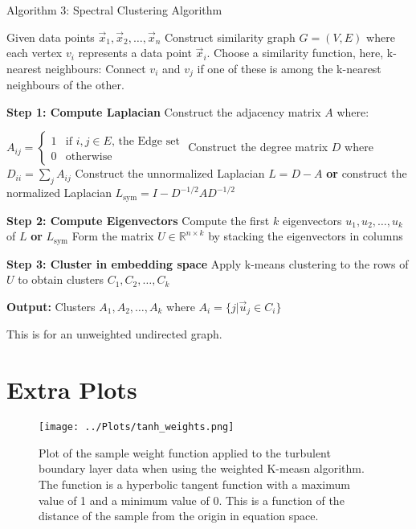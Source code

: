 \documentclass[12pt]{report} %
\begin{document}
\newpage

\begin{definitionbox}{Algorithm 3: Spectral Clustering Algorithm}
  \begin{algorithmic}[1]
    \State Given data points $\vec{x}_1, \vec{x}_2, \ldots, \vec{x}_n$ 
    \State Construct similarity graph $G = (V, E)$ where each vertex $v_i$ represents a data point $\vec{x}_i$. 
    \State Choose a similarity function, here, k-nearest neighbours: Connect $v_{i}$ and $v_{j}$ if one of these is among the k-nearest neighbours of the other.

    \State \textbf{Step 1: Compute Laplacian}
    \State Construct the adjacency matrix $A$ where:

    $A_{ij} = \begin{cases} 1 & \text{if } {i,j} \in E\text{, the Edge set} \\0 & \text{otherwise} \end{cases}$
    \State Construct the degree matrix $D$ where $D_{ii} = \sum_{j} A_{ij}$
    \State Construct the unnormalized Laplacian $L = D - A$
    \State \textbf{or} construct the normalized Laplacian $L_{\text{sym}} = I - D^{-1/2} A D^{-1/2}$

    \State \textbf{Step 2: Compute Eigenvectors}
    \State Compute the first $k$ eigenvectors $u_1, u_2, \ldots, u_k$ of $L$ \textbf{or} $L_{\text{sym}}$
    \State Form the matrix $U \in \mathbb{R}^{n \times k}$ by stacking the eigenvectors in columns

    \State \textbf{Step 3: Cluster in embedding space}
    \State Apply k-means clustering to the rows of $U$ to obtain clusters $C_1, C_2, \ldots, C_k$

    \State \textbf{Output:} Clusters $A_1, A_2, \ldots, A_k$ where $A_i = \{ j | \vec{u}_j \in C_i \}$
  \end{algorithmic}
  This is for an unweighted undirected graph.\cite{luxburg2007tutorial}
  \label{alg:Spect_Clust}
\end{definitionbox}

\newpage

\section{Extra Plots}

\begin{figure}[htbp]
    \centering
    \texttt{[image: ../Plots/tanh\_weights.png]}
    \caption{Plot of the sample weight function applied to the turbulent boundary layer data when using the weighted K-measn algorithm. The function is a hyperbolic tangent function with a maximum value of 1 and a minimum value of 0. This is a function of the distance of the sample from the origin in equation space.}
    \label{fig:WKmeans_weights}
\end{figure}
\end{document}
